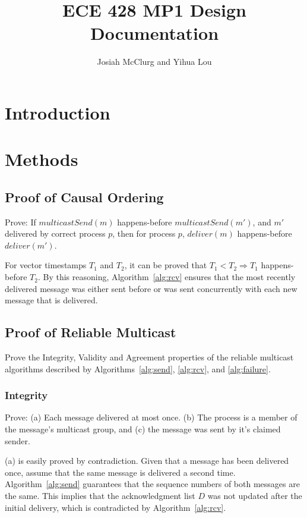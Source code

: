 \documentclass[]{article}
\title{ECE 428 MP1 Design Documentation}
\author{Josiah McClurg and Yihua Lou}
\begin{document}
\SetAlgoNoLine
\maketitle

\begin{abstract}

\end{abstract}

\section{Introduction}
\section{Methods}
\subsection{Proof of Causal Ordering}
Prove: If $multicastSend(m)$ happens-before $multicastSend(m')$, and $m'$ delivered by correct process $p$, then for process $p$, $deliver(m)$ happens-before $deliver(m')$.

For vector timestamps $T_1$ and $T_2$, it can be proved that $T_1 < T_2 \Rightarrow T_1$ happens-before $T_2$. By this reasoning, Algorithm~\ref{alg:rcv} ensures that the most recently delivered message was either sent before or was sent concurrently with each new message that is delivered.

\subsection{Proof of Reliable Multicast}
Prove the Integrity, Validity and Agreement properties of the reliable multicast algorithms described by Algorithms~\ref{alg:send}, \ref{alg:rcv}, and \ref{alg:failure}.

\subsubsection{Integrity}
Prove: (a) Each message delivered at most once. (b) The process is a member of the message's multicast group, and (c) the message was sent by it's claimed sender.

(a) is easily proved by contradiction. Given that a message has been delivered once, assume that the same message is delivered a second time. Algorithm~\ref{alg:send} guarantees that the sequence numbers of both messages are the same. This implies that the acknowledgment list $D$ was not updated after the initial delivery, which is contradicted by Algorithm~\ref{alg:rcv}.
\end{document}
